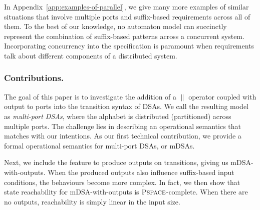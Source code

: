  In Appendix~\ref{app:examples-of-parallel}, we give many more examples of similar situations that involve multiple ports and suffix-based requirements across all of them. To the best of our knowledge, no automaton model can succinctly represent the combination of suffix-based patterns across a concurrent system. Incorporating concurrency into the specification is paramount when requirements talk about different components of a distributed system. 
  
  \subsubsection*{Contributions.} The goal of this paper is to investigate the
  addition of a $\parallel$ operator coupled with output to ports into the
  transition syntax of DSAs. We call the resulting model as \emph{multi-port
  DSAs}, where the alphabet is distributed (partitioned) across multiple ports.
  The challenge lies in describing an operational semantics that matches with
  our intentions. As our first technical contribution, we provide a formal
  operational semantics for multi-port DSAs, or mDSAs.
  
  Next, we include the feature to produce outputs on transitions, giving us mDSA-with-outputs. When the produced outputs also influence suffix-based input conditions, the behaviours become more complex. In fact, we then show that state reachability for mDSA-with-outputs is $\operatorname{\textsc{Pspace}}$-complete. When there are no outputs, reachability is simply linear in the input size. %

